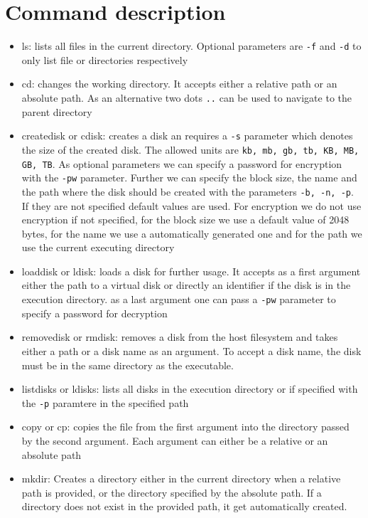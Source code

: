 \documentclass{report}
\begin{document}
\section{Command description}
\begin{itemize}
\item ls: lists all files in the current directory. Optional parameters are \texttt{-f} and \texttt{-d} to only list file or directories respectively
\item cd: changes the working directory. It accepts either a relative path or an absolute path. As an alternative two dots \texttt{..} can be used to navigate to the parent directory
\item createdisk or cdisk: creates a disk an requires a \texttt{-s} parameter which denotes the size of the created disk. The allowed units are \texttt{kb, mb, gb, tb, KB, MB, GB, TB}. As optional parameters we can specify a password for encryption with the \texttt{-pw} parameter. Further we can specify the block size, the name and the path where the disk should be created with the parameters \texttt{-b, -n, -p}. If they are not specified default values are used. For encryption we do not use encryption if not specified, for the block size we use a default value of 2048 bytes, for the name we use a automatically generated one and for the path we use the current executing directory
\item loaddisk or ldisk: loads a disk for further usage. It accepts as a first argument either the path to a virtual disk or directly an identifier if the disk is in the execution directory. as a last argument one can pass a \texttt{-pw} parameter to specify a password for decryption
\item removedisk or rmdisk: removes a disk from the host filesystem and takes either a path or a disk name as an argument. To accept a disk name, the disk must be in the same directory as the executable.
\item listdisks or ldisks: lists all disks in the execution directory or if specified with the \texttt{-p} paramtere in the specified path
\item copy or cp: copies the file from the first argument into the directory passed by the second argument. Each argument can either be a relative or an absolute path
\item mkdir: Creates a directory either in the current directory when a relative path is provided, or the directory specified by the absolute path. If a directory does not exist in the provided path, it get automatically created.

\end{itemize}
\end{document}

